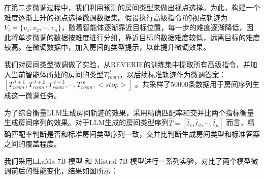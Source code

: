 \documentclass[bachelor]{thesis-uestc}
\begin{document}
在第二步微调过程中，我们利用预测的房间类型来做出视点选择。为此，构建一个难度逐渐上升的视点选择微调数据集。假设执行高级指令$I$的视点轨迹为$V_i=\{v_1,v_2,\cdots,v_n\}$，随着智能体逐渐靠近目标位置，每一步的难度逐渐降低，因此将单步微调的数据按难度进行分组，靠近目标的数据难度较低，远离目标的难度较高。在微调数据中，加入房间的类型提示，以此提升微调效果。

我们对房间类型微调做了实验，从REVERIE的训练集中提取所有高级指令，并加入当前智能体所处的房间的类型$T_{room}^{\,\,t}$，以后续标准轨迹作为微调答案：$[T^{\,\,t+1}_{room},T_{room}^{\,\,t+2},T_{room}^{\,\,t+3},\cdots,T_{room}^{\,\,n},<stop>]$ 。共采样了50000条数据用于房间序列生成这一微调任务。

为了综合衡量LLM生成房间轨迹的效果，采用精确匹配率和交并比两个指标衡量生成房间序列的效果。对于LLM生成的房间类型序列$\hat{T} = [\hat{t}_1,\hat{t}_2,\cdots,\hat{t}_n]$ 而言，精确匹配率判断是否和标准房间类型序列一致，交并比判断生成房间类型和标准答案之间的覆盖程度。

我们采用LLaMa-7B 模型 和 Mistral-7B 模型进行一系列实验，对比了两个模型微调前后的性能变化，结果如图所示：
\end{document}
